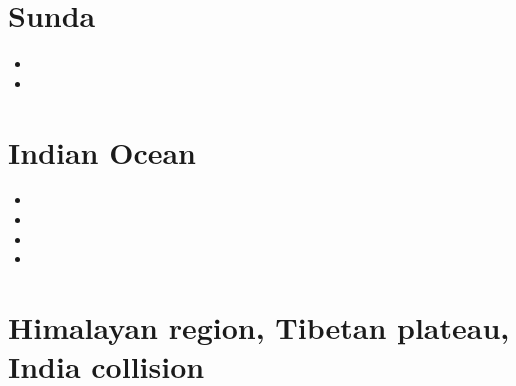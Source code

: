 \section{Sunda}

\begin{scriptsize}
\begin{itemize}
\item[\twothousandeighteen]
\item[\twothousandtwentytwo]
\end{itemize}
\end{scriptsize}

\section{Indian Ocean} 

\begin{scriptsize}
\begin{itemize}
\item[\nineteenseventythree]
\item[\twothousandtwelve]
\item[\twothousandseventeen]
\item[\twothousandtwentytwo] 
\end{itemize}
\end{scriptsize}

\section{Himalayan region, Tibetan plateau, India collision} 

